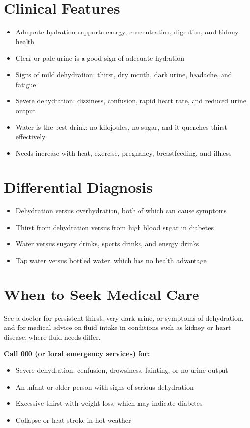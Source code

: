 \section*{Clinical Features}
\begin{itemize}
    \item Adequate hydration supports energy, concentration, digestion, and kidney health
    \item Clear or pale urine is a good sign of adequate hydration
    \item Signs of mild dehydration: thirst, dry mouth, dark urine, headache, and fatigue
    \item Severe dehydration: dizziness, confusion, rapid heart rate, and reduced urine output
    \item Water is the best drink: no kilojoules, no sugar, and it quenches thirst effectively
    \item Needs increase with heat, exercise, pregnancy, breastfeeding, and illness
\end{itemize}

\section*{Differential Diagnosis}
\begin{itemize}
    \item Dehydration versus overhydration, both of which can cause symptoms
    \item Thirst from dehydration versus from high blood sugar in diabetes
    \item Water versus sugary drinks, sports drinks, and energy drinks
    \item Tap water versus bottled water, which has no health advantage
\end{itemize}

\section*{When to Seek Medical Care}
See a doctor for persistent thirst, very dark urine, or symptoms of dehydration, and for medical advice on fluid intake in conditions such as kidney or heart disease, where fluid needs differ.

\textbf{Call 000 (or local emergency services) for:}
\begin{itemize}
    \item Severe dehydration: confusion, drowsiness, fainting, or no urine output
    \item An infant or older person with signs of serious dehydration
    \item Excessive thirst with weight loss, which may indicate diabetes
    \item Collapse or heat stroke in hot weather
\end{itemize}

